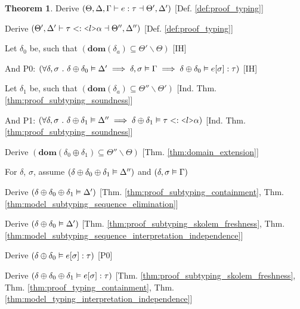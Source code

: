\documentclass[acmsmall]{acmart}
\theoremstyle{definition}
\newtheorem{theorem}{Theorem}[section]
\begin{document}
\begin{theorem}
  \item \I \N Derive $(
    \Theta, \Delta, \Gamma \vdash e : \tau \dashv \Theta', \Delta'
  )$ [Def. \ref{def:proof_typing}]

  \item \I \N Derive $(
    \Theta', \Delta' \entails \tau \subtypes  \J{<} l \J{>} \alpha \given \Theta'', \Delta''
  )$ [Def. \ref{def:proof_typing}]


  \item \I \N Let $\delta_0$ be, such that $(
    \textbf{dom}(\delta_a) \subseteq \Theta' \backslash \Theta
  )$ [IH]

  \item \I \N And P0: $(
    \forall \delta, \sigma \ .\  
    \delta \oplus \delta_0 \vDash \Delta' \implies
    \delta, \sigma \vDash \Gamma \implies
    \delta \oplus \delta_0 \vDash e[\sigma] : \tau
  )$ [IH]

  \item \I \N Let $\delta_1$ be, such that $(
    \textbf{dom}(\delta_a) \subseteq \Theta'' \backslash \Theta'
  )$ [Ind. Thm. \ref{thm:proof_subtyping_soundness}]

  \item \I \N And P1: $(
    \forall \delta, \sigma \qua 
    \delta \oplus \delta_1 \satisfies \Delta'' \implies
    \delta \oplus \delta_1 \satisfies \tau \subtypes \J{<}l\J{>}\alpha
  )$ [Ind. Thm. \ref{thm:proof_subtyping_soundness}]

  \item \I \N Derive $(
    \textbf{dom}(\delta_0 \oplus \delta_1) \subseteq \Theta'' \backslash \Theta
  )$ [Thm. \ref{thm:domain_extension}]

  \item \I \N For $\delta$, $\sigma$,
    assume $(\delta \oplus \delta_0 \oplus \delta_1 \vDash \Delta'')$
    and $(\delta, \sigma \vDash \Gamma)$

  \item \I\I \N Derive $(
    \delta \oplus \delta_0 \oplus \delta_1 \vDash \Delta'
  )$ [Thm. \ref{thm:proof_subtyping_containment}, Thm. \ref{thm:model_subtyping_sequence_elimination}]
  \item \I\I \N Derive $(
    \delta \oplus \delta_0 \vDash \Delta'
  )$ [Thm. \ref{thm:proof_subtyping_skolem_freshness}, Thm. \ref{thm:model_subtyping_sequence_interpretation_independence}]
  \item \I\I \N Derive $(
    \delta \oplus \delta_0 \vDash e[\sigma] : \tau
  )$ [P0]
  \item \I\I \N Derive $(
    \delta \oplus \delta_0 \oplus \delta_1 \vDash e[\sigma] : \tau
  )$ [Thm. \ref{thm:proof_subtyping_skolem_freshness}, 
      Thm. \ref{thm:proof_typing_containment},
      Thm. \ref{thm:model_typing_interpretation_independence}]


\end{theorem}
\end{document}
